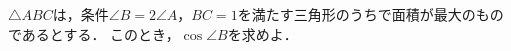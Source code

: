 \documentclass[../../main.tex]{subfiles}
\begin{document}
$\triangle ABC$は，条件$\angle B=2\angle A$，$BC=1$を満たす三角形のうちで面積が最大のものであるとする．
このとき，$\cos\angle B$を求めよ．
\end{document}
